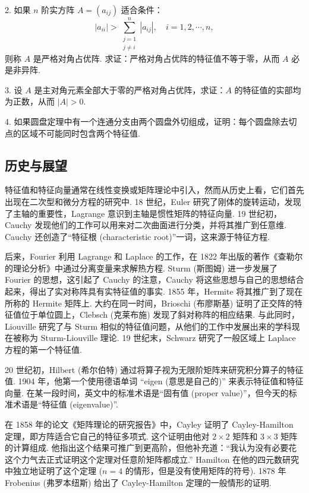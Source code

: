 \documentclass[UTF8,12pt,a4paper,fontset=fandol]{ctexart}
\begin{document}
2. 如果 $n$ 阶实方阵 $A=(a_{ij})$ 适合条件：
\[
|a_{ii}|>\sum_{\substack{j=1\\j\neq i}}^n |a_{ij}|,\quad i=1,2,\cdots,n,
\]
则称 $A$ 是严格对角占优阵. 求证：严格对角占优阵的特征值不等于零，从而 $A$ 必是非异阵.

3. 设 $A$ 是主对角元素全部大于零的严格对角占优阵，求证：$A$ 的特征值的实部均为正数，从而 $|A|>0$.

4. 如果圆盘定理中有一个连通分支由两个圆盘外切组成，证明：每个圆盘除去切点的区域不可能同时包含两个特征值.

\subsection*{历史与展望}

特征值和特征向量通常在线性变换或矩阵理论中引入，然而从历史上看，它们首先出现在二次型和微分方程的研究中. 18 世纪，Euler 研究了刚体的旋转运动，发现了主轴的重要性，Lagrange 意识到主轴是惯性矩阵的特征向量. 19 世纪初，Cauchy 发现他们的工作可以用来对二次曲面进行分类，并将其推广到任意维. Cauchy 还创造了“特征根 (characteristic root)”一词，这来源于特征方程.

后来，Fourier 利用 Lagrange 和 Laplace 的工作，在 1822 年出版的著作《查勒尔的理论分析》中通过分离变量来求解热方程. Sturm (斯图姆) 进一步发展了 Fourier 的思想，这引起了 Cauchy 的注意，Cauchy 将这些思想与自己的思想结合起来，得出了实对称阵具有实特征值的事实. 1855 年，Hermite 将其推广到了现在所称的 Hermite 矩阵上. 大约在同一时间，Brioschi (布廖斯基) 证明了正交阵的特征值位于单位圆上，Clebsch (克莱布施) 发现了斜对称阵的相应结果. 与此同时，Liouville 研究了与 Sturm 相似的特征值问题，从他们的工作中发展出来的学科现在被称为 Sturm-Liouville 理论. 19 世纪末，Schwarz 研究了一般区域上 Laplace 方程的第一个特征值.

20 世纪初，Hilbert (希尔伯特) 通过将算子视为无限阶矩阵来研究积分算子的特征值. 1904 年，他第一个使用德语单词 “eigen (意思是自己的)” 来表示特征值和特征向量. 在某一段时间，英文中的标准术语是“固有值 (proper value)”，但今天的标准术语是“特征值 (eigenvalue)”.

在 1858 年的论文《矩阵理论的研究报告》中，Cayley 证明了 Cayley-Hamilton 定理，即方阵适合它自己的特征多项式. 这个证明由他对 $2\times 2$ 矩阵和 $3\times 3$ 矩阵的计算组成. 他指出这个结果可推广到更高阶，但他补充道：“我认为没有必要花这个力气去正式证明这个定理对任意阶矩阵都成立.” Hamilton 在他的四元数研究中独立地证明了这个定理 ($n=4$ 的情形，但是没有使用矩阵的符号). 1878 年 Frobenius (弗罗本纽斯) 给出了 Cayley-Hamilton 定理的一般情形的证明.
\end{document}
